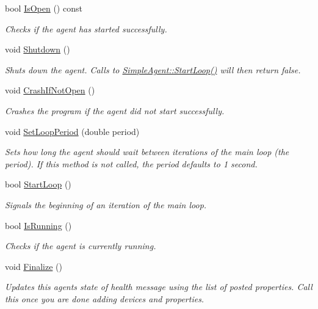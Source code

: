 \begin{DoxyCompactItemize}
bool \hyperlink{classcubesat_1_1SimpleAgent_a7ab6f2f416e8fb1cb5009c3a23d6805a}{Is\+Open} () const
\begin{DoxyCompactList}\small\item\em Checks if the agent has started successfully. \end{DoxyCompactList}\item 
void \hyperlink{classcubesat_1_1SimpleAgent_a1b7189441b53515286ba3e6358f24edf}{Shutdown} ()
\begin{DoxyCompactList}\small\item\em Shuts down the agent. Calls to \hyperlink{classcubesat_1_1SimpleAgent_a84d504d569e58628a9ae6007c34b8463}{Simple\+Agent\+::\+Start\+Loop()} will then return false. \end{DoxyCompactList}\item 
void \hyperlink{classcubesat_1_1SimpleAgent_a0426d71590286b737e543bb8223dadee}{Crash\+If\+Not\+Open} ()
\begin{DoxyCompactList}\small\item\em Crashes the program if the agent did not start successfully. \end{DoxyCompactList}\item 
void \hyperlink{classcubesat_1_1SimpleAgent_acdb5ed645b45e352a921c630e2f6c67e}{Set\+Loop\+Period} (double period)
\begin{DoxyCompactList}\small\item\em Sets how long the agent should wait between iterations of the main loop (the period). If this method is not called, the period defaults to 1 second. \end{DoxyCompactList}\item 
bool \hyperlink{classcubesat_1_1SimpleAgent_a84d504d569e58628a9ae6007c34b8463}{Start\+Loop} ()
\begin{DoxyCompactList}\small\item\em Signals the beginning of an iteration of the main loop. \end{DoxyCompactList}\item 
bool \hyperlink{classcubesat_1_1SimpleAgent_af347537f1b971c336e651a0e5a423512}{Is\+Running} ()
\begin{DoxyCompactList}\small\item\em Checks if the agent is currently running. \end{DoxyCompactList}\item 
void \hyperlink{classcubesat_1_1SimpleAgent_afe5e23b701690a39695449ee8a4c955a}{Finalize} ()
\begin{DoxyCompactList}\small\item\em Updates this agent\textquotesingle{}s state of health message using the list of posted properties. Call this once you are done adding devices and properties. \end{DoxyCompactList}\item 

\end{DoxyCompactItemize}
